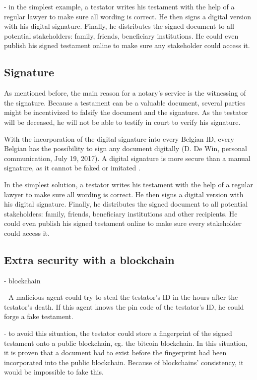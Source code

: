 - in the simplest example, a testator writes his testament with the help of a regular lawyer to make sure all wording is correct. He then signs a digital version with his digital signature. Finally, he distributes the signed document to all potential stakeholders: family, friends, beneficiary institutions. He could even publish his signed testament online to make sure any stakeholder could access it.
\fi

\subsection{Signature}

 As mentioned before, the main reason for a notary's service is the witnessing of the signature. Because a testament can be a valuable document, several parties might be incentivized to falsify the document and the signature. As the testator will be deceased, he will not be able to testify in court to verify his signature.

 With the incorporation of the digital signature into every Belgian ID, every Belgian has the possibility to sign any document digitally (D. De Win, personal communication, July 19, 2017). A digital signature is more secure than a manual signature, as it cannot be faked or imitated \cite{belgian-eid}. 

 In the simplest solution, a testator writes his testament with the help of a regular lawyer to make sure all wording is correct. He then signs a digital version with his digital signature. Finally, he distributes the signed document to all potential stakeholders: family, friends, beneficiary institutions and other recipients. He could even publish his signed testament online to make sure every stakeholder could access it.


\subsection{Extra security with a blockchain}

\iffalse
- blockchain

- A malicious agent could try to steal the testator's ID in the hours after the testator's death. If this agent knows the pin code of the testator's ID, he could forge a fake testament.

- to avoid this situation, the testator could store a fingerprint of the signed testament onto a public blockchain, eg. the bitcoin blockchain. In this situation, it is proven that a document had to exist before the fingerprint had been incorporated into the public blockchain. Because of blockchains' consistency, it would be impossible to fake this.

